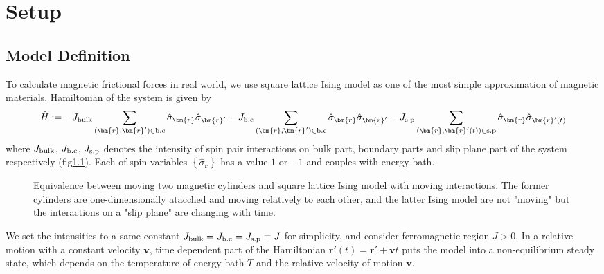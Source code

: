 \chapter{Setup}
\section{Model Definition}
To calculate magnetic frictional forces in real world, we use square lattice Ising model as one of the most simple approximation of magnetic materials\cite{Kadau2008,Hucht2009b}. Hamiltonian of the system is given by
\begin{align}
	\hat{H}:=	-J_{\rm bulk}	\sum_{\left(\bm{r}, \bm{r}'\right)\in\mathrm{b.c}}	 \hat{\sigma}_{\bm{r}}\hat{\sigma}_{\bm{r}'}
				-J_{\rm b.c}	\sum_{\left(\bm{r}, \bm{r}'\right)\in\mathrm{b.c}}	 \hat{\sigma}_{\bm{r}}\hat{\sigma}_{\bm{r}'}
				- J_{\rm s.p}	\sum_{\left(\bm{r}, \bm{r}'(t)\right)\in\mathrm{s.p}}\hat{\sigma}_{\bm{r}}\hat{\sigma}_{\bm{r}'(t)}\label{Hamiltonian}
\end{align}
where $J_{\rm bulk}$, $J_{\rm b.c}$, $J_{\rm s.p}$ denotes the intensity of spin pair interactions on bulk part, boundary parts and slip plane part of the system respectively (fig\ref{ModelDecomp}). Each of spin variables $\left\{\hat{\sigma}_{\bm{r}}\right\}$ has a value $1$ or $-1$ and couples with energy bath.

\begin{figure}[htbp]
	\begin{center}
		\caption{Equivalence between moving two magnetic cylinders and square lattice Ising model with moving interactions. The former cylinders are one-dimensionally atacched and moving relatively to each other, and the latter Ising model are not "moving" but the interactions on a "slip plane" are changing with time.}
		\label{ModelDecomp}
	\end{center}
\end{figure}

We set the intensities to a same constant $J_{\rm bulk} = J_{\rm b.c} = J_{\rm s.p} \equiv J$ for simplicity, and consider ferromagnetic region $J > 0$. In a relative motion with a constant velocity $\bm{v}$, time dependent part of the Hamiltonian $\bm{r}'(t) = \bm{r}' + \bm{v}t$ puts the model into a non-equilibrium steady state, which depends on the temperature of energy bath $T$ and the relative velocity of motion $\bm{v}$.

